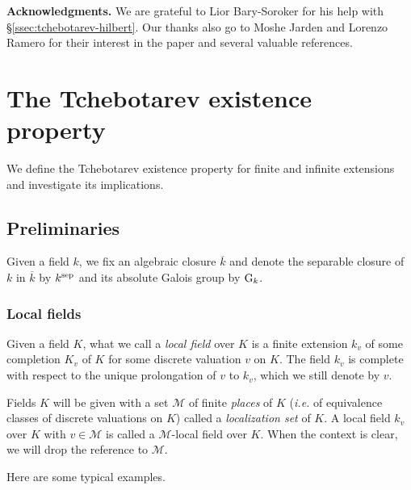 \documentclass[12pt,english]{amsart}
\newtheorem{twisting lemma}[theorem]{Twisting lemma}
\begin{document}
\vskip 2mm

\noindent
{\bf Acknowledgments.} We are grateful to Lior Bary-Soroker for his help with \S \ref{ssec:tchebotarev-hilbert}. 
Our thanks also go to Moshe Jarden and Lorenzo Ramero for their interest in the paper and several valuable references. 

\section{The Tchebotarev existence property} \label{sec:tchebotarev-property}

We define the Tchebotarev existence property for finite and infinite extensions and investigate 
 its implications.

\subsection{Preliminaries}

Given a field $k$, we fix an algebraic closure $\overline k$ and denote the separable closure of $k$ in $\overline k$ by $k^{{\scriptsize\hbox{\rm sep}}}$ and its absolute Galois group by ${\hbox{\rm G}}_k$. 

\subsubsection{Local fields}
Given a field $K$, what we call a {\it local field} over $K$ 
is a finite extension $k_v$ of some completion $K_v$ of $K$ for some discrete valuation $v$ on $K$. The field $k_v$ is complete with respect to the unique prolongation of $v$ to $k_v$, which we still denote by $v$. 

Fields $K$ will be given with a set ${\mathcal M}$ of finite {\it places} of $K$ ({\it i.e.} of equivalence classes of discrete valuations on $K$) called a {\it localization set} of $K$. A local field $k_v$ over 
$K$ with $v\in {\mathcal M}$ is called a ${\mathcal M}$-local field over $K$.
When the context is clear, we will drop the reference to ${\mathcal M}$.

Here are some typical examples. 
\end{document}
